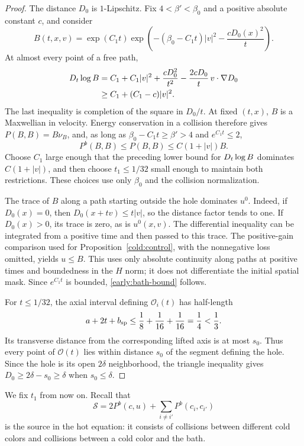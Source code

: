 \begin{proof}
The distance $D_0$ is $1$-Lipschitz. Fix $4<\beta'<\beta_0$ and a
positive absolute constant $c$, and consider
\[
 B(t,x,v)=\exp(C_1t)\exp\!\left(
       -(\beta_0-C_1t)|v|^2-\frac{cD_0(x)^2}{t}\right).
\]
At almost every point of a free path,
\begin{align*}
 D_t\log B
 &=C_1+C_1|v|^2+\frac{cD_0^2}{t^2}
                  -\frac{2cD_0}{t}\,v\cdot\nabla D_0\\
 &\ge C_1+(C_1-c)|v|^2.
\end{align*}
The last inequality is completion of the square in $D_0/t$.
At fixed $(t,x)$, $B$ is a Maxwellian in velocity. Energy conservation in a
collision therefore gives $P(B,B)=B\nu_B$, and, as long as
$\beta_0-C_1t\ge\beta'>4$ and $e^{C_1t}\le2$,
\[
 P^b(B,B)\le P(B,B)\le C(1+|v|)B.
\]
Choose $C_1$ large enough that the preceding lower bound for
$D_t\log B$ dominates $C(1+|v|)$, and then choose $t_1\le1/32$ small
enough to maintain both restrictions. These choices use only $\beta_0$
and the collision normalization.

The trace of $B$ along a path starting outside the hole dominates $u^0$.
Indeed, if $D_0(x)=0$, then $D_0(x+tv)\le t|v|$, so the distance factor
tends to one. If $D_0(x)>0$, its trace is zero, as is $u^0(x,v)$.
The differential inequality can be integrated from a positive time and
then passed to this trace. The positive-gain comparison used for
Proposition~\ref{cold:control}, with the nonnegative loss omitted, yields $u\le B$.
This uses only absolute continuity along paths at positive times and
boundedness in the $H$ norm; it does not differentiate the initial spatial
mask. Since $e^{C_1t}$ is bounded, \eqref{early:bath-bound} follows.

For $t\le1/32$, the axial interval defining $\mathcal O_i(t)$ has
half-length
\[
 a+2t+b_{\rm sp}\le\frac18+\frac1{16}+\frac1{16}=\frac14<\frac13.
\]
Its transverse distance from the corresponding lifted axis is at most
$s_0$. Thus every point of $\mathcal O(t)$ lies within distance $s_0$ of
the segment defining the hole. Since the hole is its open $2\delta$
neighborhood, the triangle inequality gives
$D_0\ge2\delta-s_0\ge\delta$ when $s_0\le\delta$.
\end{proof}

We fix $t_1$ from now on. Recall that
\[
 \mathcal S=2P^b(c,u)+\sum_{i\ne i'}P^b(c_i,c_{i'})
\]
is the source in the hot equation: it consists of collisions between
different cold colors and collisions between a cold color and the bath.

